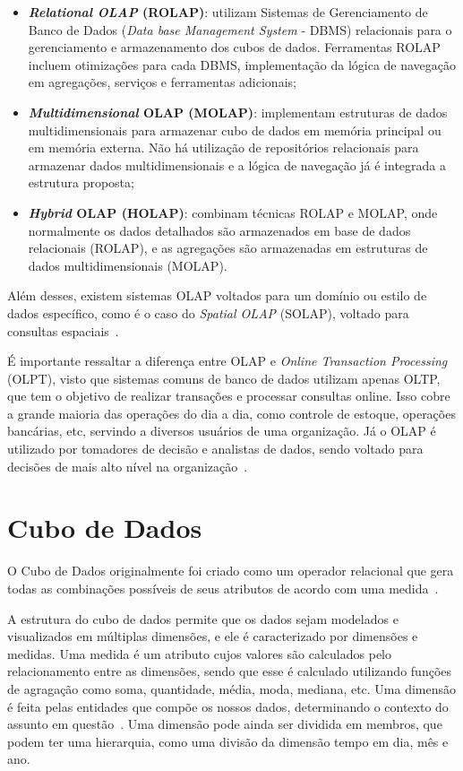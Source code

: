 \begin{itemize}
	\item \textbf{\textit{Relational OLAP} (ROLAP)}: utilizam Sistemas de Gerenciamento de Banco de Dados (\textit{Data base Management System} - DBMS) relacionais para o gerenciamento e armazenamento dos cubos de dados.
Ferramentas ROLAP incluem otimizações para cada DBMS, implementação da lógica de navegação em agregações, serviços e ferramentas adicionais;
	\item \textbf{\textit{Multidimensional} OLAP (MOLAP)}: implementam estruturas de dados multidimensionais para armazenar cubo de dados em memória principal ou em memória externa.
Não há utilização de repositórios relacionais para armazenar dados multidimensionais e a lógica de navegação já é integrada a estrutura proposta;
	\item \textbf{\textit{Hybrid} OLAP (HOLAP)}: combinam técnicas ROLAP e MOLAP, onde normalmente os dados detalhados são armazenados em base de dados relacionais (ROLAP), e as agregações são armazenadas em estruturas de dados multidimensionais (MOLAP).
\end{itemize}

Além desses, existem sistemas OLAP voltados para um domínio ou estilo de dados específico, como é o caso do \textit{Spatial OLAP} (SOLAP), voltado para consultas espaciais~\cite{viswanathanUsercentricSpatialData2014}.

É importante ressaltar a diferença entre OLAP e \textit{Online Transaction Processing} (OLPT), visto que sistemas comuns de banco de dados utilizam apenas OLTP, que tem o objetivo de realizar transações e processar consultas online.
Isso cobre a grande maioria das operações do dia a dia, como controle de estoque, operações bancárias, etc, servindo a diversos usuários de uma organização.
Já o OLAP é utilizado por tomadores de decisão e analistas de dados, sendo voltado para decisões de mais alto nível na organização~\cite{hanDataMiningConcepts2011}.

\section{Cubo de Dados}
\label{ch:fun:cube}

O Cubo de Dados originalmente foi criado como um operador relacional que gera todas as combinações possíveis de seus atributos de acordo com uma medida~\cite{grayDataCubeRelational1996}.

A estrutura do cubo de dados permite que os dados sejam modelados e visualizados em múltiplas dimensões, e ele é caracterizado por dimensões e medidas.
Uma medida é um atributo cujos valores são calculados pelo relacionamento entre as dimensões, sendo que esse é calculado utilizando funções de agragação como soma, quantidade, média, moda, mediana, etc.
Uma dimensão é feita pelas entidades que compõe os nossos dados, determinando o contexto do assunto em questão~\cite{hanDataMiningConcepts2011}.
Uma dimensão pode ainda ser dividida em membros, que podem ter uma hierarquia, como uma divisão da dimensão tempo em dia, mês e ano.

